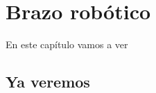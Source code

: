 \chapter{Brazo robótico}
\label{ch:BrazoRobotico}

En este capítulo vamos a ver 


\section{Ya veremos}
\label{sec:pm_yaveremos}
